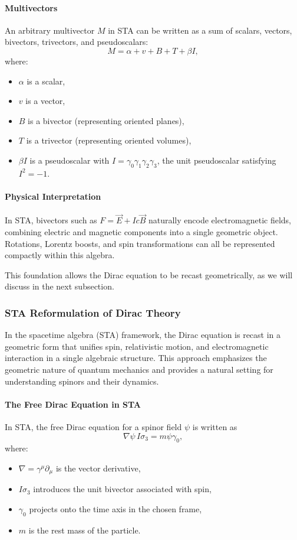 \documentclass[12pt]{article}
\begin{document}
\paragraph{Multivectors}
An arbitrary multivector \(M\) in STA can be written as a sum of scalars, vectors, bivectors, trivectors, and pseudoscalars:
\[
M = \alpha + v + B + T + \beta I,
\]
where:
\begin{itemize}
    \item \(\alpha\) is a scalar,
    \item \(v\) is a vector,
    \item \(B\) is a bivector (representing oriented planes),
    \item \(T\) is a trivector (representing oriented volumes),
    \item \(\beta I\) is a pseudoscalar with \(I=\gamma_0\gamma_1\gamma_2\gamma_3\), the unit pseudoscalar satisfying \(I^2=-1\).
\end{itemize}

\paragraph{Physical Interpretation}
In STA, bivectors such as \(F = \vec{E} + I c \vec{B}\) naturally encode electromagnetic fields, combining electric and magnetic components into a single geometric object. Rotations, Lorentz boosts, and spin transformations can all be represented compactly within this algebra.

This foundation allows the Dirac equation to be recast geometrically, as we will discuss in the next subsection.

\subsubsection{STA Reformulation of Dirac Theory}\label{subsec:sta_dirac}

In the spacetime algebra (STA) framework, the Dirac equation is recast in a geometric form that unifies spin, relativistic motion, and electromagnetic interaction in a single algebraic structure. This approach emphasizes the geometric nature of quantum mechanics and provides a natural setting for understanding spinors and their dynamics.

\paragraph{The Free Dirac Equation in STA}
In STA, the free Dirac equation for a spinor field \(\psi\) is written as
\[
\nabla\psi\,I\sigma_3 = m\psi\gamma_0,
\]
where:
\begin{itemize}
    \item \(\nabla = \gamma^\mu\partial_\mu\) is the vector derivative,
    \item \(I\sigma_3\) introduces the unit bivector associated with spin,
    \item \(\gamma_0\) projects onto the time axis in the chosen frame,
    \item \(m\) is the rest mass of the particle.
\end{itemize}
\end{document}
